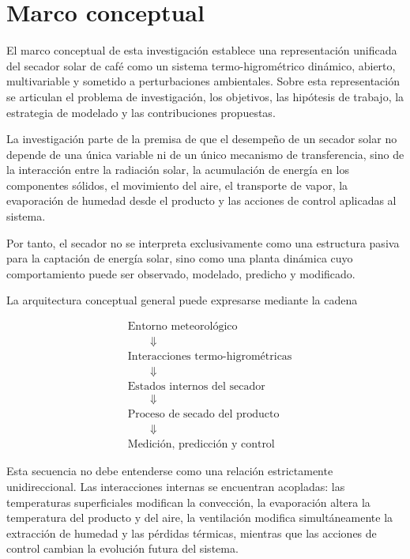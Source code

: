 \section{Marco conceptual}
\label{sec:marco_conceptual}

El marco conceptual de esta investigación establece una representación unificada del secador solar de café como un sistema termo-higrométrico dinámico, abierto, multivariable y sometido a perturbaciones ambientales. Sobre esta representación se articulan el problema de investigación, los objetivos, las hipótesis de trabajo, la estrategia de modelado y las contribuciones propuestas.

La investigación parte de la premisa de que el desempeño de un secador solar no depende de una única variable ni de un único mecanismo de transferencia, sino de la interacción entre la radiación solar, la acumulación de energía en los componentes sólidos, el movimiento del aire, el transporte de vapor, la evaporación de humedad desde el producto y las acciones de control aplicadas al sistema.

Por tanto, el secador no se interpreta exclusivamente como una estructura pasiva para la captación de energía solar, sino como una planta dinámica cuyo comportamiento puede ser observado, modelado, predicho y modificado.

La arquitectura conceptual general puede expresarse mediante la cadena

\begin{equation}
\boxed{
\begin{aligned}
&\text{Entorno meteorológico}
\\[-0.05cm]
&\qquad\Downarrow
\\[-0.05cm]
&\text{Interacciones termo-higrométricas}
\\[-0.05cm]
&\qquad\Downarrow
\\[-0.05cm]
&\text{Estados internos del secador}
\\[-0.05cm]
&\qquad\Downarrow
\\[-0.05cm]
&\text{Proceso de secado del producto}
\\[-0.05cm]
&\qquad\Downarrow
\\[-0.05cm]
&\text{Medición, predicción y control}
\end{aligned}
}
\label{eq:cadena_conceptual_general}
\end{equation}

Esta secuencia no debe entenderse como una relación estrictamente unidireccional. Las interacciones internas se encuentran acopladas: las temperaturas superficiales modifican la convección, la evaporación altera la temperatura del producto y del aire, la ventilación modifica simultáneamente la extracción de humedad y las pérdidas térmicas, mientras que las acciones de control cambian la evolución futura del sistema.


